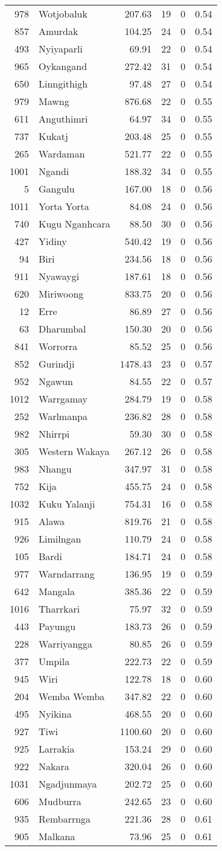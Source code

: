 \begin{longtable}[]{@{}rlrrrr@{}}
978 & Wotjobaluk & 207.63 & 19 & 0 & 0.54\tabularnewline
857 & Amurdak & 104.25 & 24 & 0 & 0.54\tabularnewline
493 & Nyiyaparli & 69.91 & 22 & 0 & 0.54\tabularnewline
965 & Oykangand & 272.42 & 31 & 0 & 0.54\tabularnewline
650 & Linngithigh & 97.48 & 27 & 0 & 0.54\tabularnewline
979 & Mawng & 876.68 & 22 & 0 & 0.55\tabularnewline
611 & Anguthimri & 64.97 & 34 & 0 & 0.55\tabularnewline
737 & Kukatj & 203.48 & 25 & 0 & 0.55\tabularnewline
265 & Wardaman & 521.77 & 22 & 0 & 0.55\tabularnewline
1001 & Ngandi & 188.32 & 34 & 0 & 0.55\tabularnewline
5 & Gangulu & 167.00 & 18 & 0 & 0.56\tabularnewline
1011 & Yorta Yorta & 84.08 & 24 & 0 & 0.56\tabularnewline
740 & Kugu Nganhcara & 88.50 & 30 & 0 & 0.56\tabularnewline
427 & Yidiny & 540.42 & 19 & 0 & 0.56\tabularnewline
94 & Biri & 234.56 & 18 & 0 & 0.56\tabularnewline
911 & Nyawaygi & 187.61 & 18 & 0 & 0.56\tabularnewline
620 & Miriwoong & 833.75 & 20 & 0 & 0.56\tabularnewline
12 & Erre & 86.89 & 27 & 0 & 0.56\tabularnewline
63 & Dharumbal & 150.30 & 20 & 0 & 0.56\tabularnewline
841 & Worrorra & 85.52 & 25 & 0 & 0.56\tabularnewline
852 & Gurindji & 1478.43 & 23 & 0 & 0.57\tabularnewline
952 & Ngawun & 84.55 & 22 & 0 & 0.57\tabularnewline
1012 & Warrgamay & 284.79 & 19 & 0 & 0.58\tabularnewline
252 & Warlmanpa & 236.82 & 28 & 0 & 0.58\tabularnewline
982 & Nhirrpi & 59.30 & 30 & 0 & 0.58\tabularnewline
305 & Western Wakaya & 267.12 & 26 & 0 & 0.58\tabularnewline
983 & Nhangu & 347.97 & 31 & 0 & 0.58\tabularnewline
752 & Kija & 455.75 & 24 & 0 & 0.58\tabularnewline
1032 & Kuku Yalanji & 754.31 & 16 & 0 & 0.58\tabularnewline
915 & Alawa & 819.76 & 21 & 0 & 0.58\tabularnewline
926 & Limilngan & 110.79 & 24 & 0 & 0.58\tabularnewline
105 & Bardi & 184.71 & 24 & 0 & 0.58\tabularnewline
977 & Warndarrang & 136.95 & 19 & 0 & 0.59\tabularnewline
642 & Mangala & 385.36 & 22 & 0 & 0.59\tabularnewline
1016 & Tharrkari & 75.97 & 32 & 0 & 0.59\tabularnewline
443 & Payungu & 183.73 & 26 & 0 & 0.59\tabularnewline
228 & Warriyangga & 80.85 & 26 & 0 & 0.59\tabularnewline
377 & Umpila & 222.73 & 22 & 0 & 0.59\tabularnewline
945 & Wiri & 122.78 & 18 & 0 & 0.60\tabularnewline
204 & Wemba Wemba & 347.82 & 22 & 0 & 0.60\tabularnewline
495 & Nyikina & 468.55 & 20 & 0 & 0.60\tabularnewline
927 & Tiwi & 1100.60 & 20 & 0 & 0.60\tabularnewline
925 & Larrakia & 153.24 & 29 & 0 & 0.60\tabularnewline
922 & Nakara & 320.04 & 26 & 0 & 0.60\tabularnewline
1031 & Ngadjunmaya & 202.72 & 25 & 0 & 0.60\tabularnewline
606 & Mudburra & 242.65 & 23 & 0 & 0.60\tabularnewline
935 & Rembarrnga & 221.36 & 28 & 0 & 0.61\tabularnewline
905 & Malkana & 73.96 & 25 & 0 & 0.61\tabularnewline

\end{longtable}
